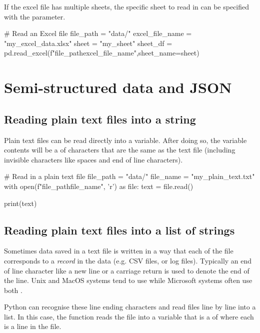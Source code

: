 If the excel file has multiple sheets, the specific sheet to read in can be specified with the  parameter.

\begin{pycode}
    # Read an Excel file
    file_path = "data/"
    excel_file_name = "my_excel_data.xlsx"
    sheet = "my_sheet"
    sheet_df = pd.read_excel(f"{file_path}{excel_file_name}",sheet_name=sheet)
\end{pycode}

\newpage
\section{Semi-structured data and JSON}

\subsection{Reading plain text files into a string}

Plain text files can be read directly into a variable. After doing so, the variable contents will be a  of characters that are the same as the text file (including invisible characters like spaces and end of line characters).

\begin{pycode}
    # Read in a plain text file
    file_path = "data/"
    file_name = "my_plain_text.txt"
    with open(f"{file_path}{file_name}", 'r') as file:
        text = file.read()

    print(text)
\end{pycode}

\subsection{Reading plain text files into a list of strings}

Sometimes data saved in a text file is written in a way that each  of the file corresponds to a \textit{record} in the data (e.g. CSV files, or log files). Typically an end of line character like a new line \code{\n} or a carriage return \code{\r} is used to denote the end of the line. Unix and MacOS systems tend to use \code{\n} while Microsoft systems often use both \code{\n\r}.

Python can recognise these line ending characters and read files line by line into a list. In this case, the  function reads the file into a variable that is a  of  where each  is a line in the file.

